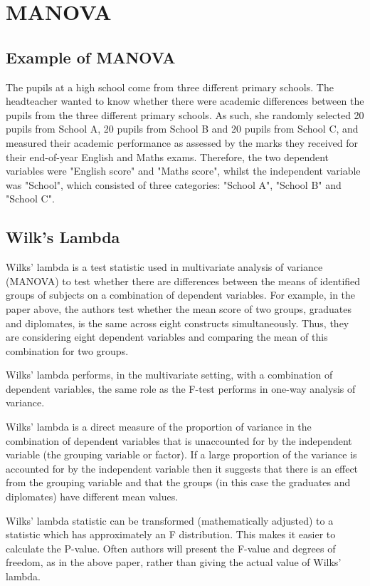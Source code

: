 
\newpage
\section{MANOVA}
\subsection{Example of MANOVA}
The pupils at a high school come from three different primary schools. The headteacher wanted to know whether there were academic differences between the pupils from the three different primary schools. As such, she randomly selected 20 pupils from School A, 20 pupils from School B and 20 pupils from School C, and measured their academic performance as assessed by the marks they received for their end-of-year English and Maths exams. Therefore, the two dependent variables were "English score" and "Maths score", whilst the independent variable was "School", which consisted of three categories: "School A", "School B" and "School C".



\subsection{Wilk's Lambda}

Wilks' lambda is a test statistic used in multivariate analysis of variance
(MANOVA) to test whether there are differences between the means of
identified groups of subjects on a combination of dependent variables. For
example, in the paper above, the authors test whether the mean score of two
groups, graduates and diplomates, is the same across eight constructs
simultaneously. Thus, they are considering eight dependent variables and
comparing the mean of this combination for two groups.

Wilks' lambda performs, in the multivariate setting, with a combination of
dependent variables, the same role as the F-test performs in one-way analysis
of variance. 

Wilks' lambda is a direct measure of the proportion of variance in
the combination of dependent variables that is unaccounted for by the
independent variable (the grouping variable or factor). If a large proportion
of the variance is accounted for by the independent variable then it suggests
that there is an effect from the grouping variable and that the groups (in this
case the graduates and diplomates) have different mean values.

Wilks' lambda statistic can be transformed (mathematically adjusted) to a
statistic which has approximately an F distribution. This makes it easier to
calculate the P-value. Often authors will present the F-value and degrees of
freedom, as in the above paper, rather than giving the actual value of Wilks'
lambda.



